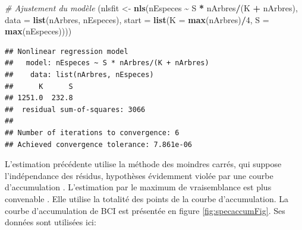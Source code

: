 \documentclass[
  11pt,
  french,
  a4paper,
  extrafontsizes,onecolumn,openright
  ]{memoir}
\newenvironment{Shaded}{\begin{snugshade}}{\end{snugshade}}
\newcommand{\AttributeTok}[1]{\textcolor[rgb]{0.13,0.29,0.53}{#1}}
\newcommand{\CommentTok}[1]{\textcolor[rgb]{0.56,0.35,0.01}{\textit{#1}}}
\newcommand{\DecValTok}[1]{\textcolor[rgb]{0.00,0.00,0.81}{#1}}
\newcommand{\FunctionTok}[1]{\textcolor[rgb]{0.13,0.29,0.53}{\textbf{#1}}}
\newcommand{\NormalTok}[1]{#1}
\newcommand{\OtherTok}[1]{\textcolor[rgb]{0.56,0.35,0.01}{#1}}
\newcommand{\SpecialCharTok}[1]{\textcolor[rgb]{0.81,0.36,0.00}{\textbf{#1}}}
\begin{document}
\scriptsize

\begin{Shaded}
\begin{Highlighting}[]
\CommentTok{\# Ajustement du modèle}
\NormalTok{(nlsfit }\OtherTok{\textless{}{-}} \FunctionTok{nls}\NormalTok{(nEspeces }\SpecialCharTok{\textasciitilde{}}\NormalTok{ S }\SpecialCharTok{*}\NormalTok{ nArbres}\SpecialCharTok{/}\NormalTok{(K }\SpecialCharTok{+}\NormalTok{ nArbres), }\AttributeTok{data =} \FunctionTok{list}\NormalTok{(nArbres,}
\NormalTok{    nEspeces), }\AttributeTok{start =} \FunctionTok{list}\NormalTok{(}\AttributeTok{K =} \FunctionTok{max}\NormalTok{(nArbres)}\SpecialCharTok{/}\DecValTok{4}\NormalTok{, }\AttributeTok{S =} \FunctionTok{max}\NormalTok{(nEspeces))))}
\end{Highlighting}
\end{Shaded}

\begin{verbatim}
## Nonlinear regression model
##   model: nEspeces ~ S * nArbres/(K + nArbres)
##    data: list(nArbres, nEspeces)
##      K      S 
## 1251.0  232.8 
##  residual sum-of-squares: 3066
## 
## Number of iterations to convergence: 6 
## Achieved convergence tolerance: 7.861e-06
\end{verbatim}

\normalsize

L'estimation précédente utilise la méthode des moindres carrés, qui suppose l'indépendance des résidus, hypothèses évidemment violée par une courbe d'accumulation \autocite{Colwell1994}.
L'estimation par le maximum de vraisemblance est plus convenable \autocite{Raaijmakers1987}.
Elle utilise la totalité des points de la courbe d'accumulation.
La courbe d'accumulation de BCI est présentée en figure \ref{fig:specaccumFig}.
Ses données sont utilisées ici:

\scriptsize
\end{document}
